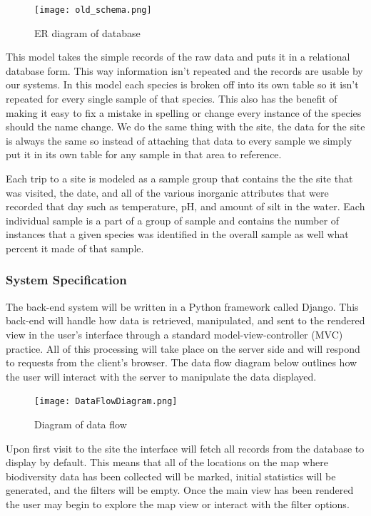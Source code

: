 \begin{figure}[h]
	\centering
	\texttt{[image: old\_schema.png]}
	\captionsetup{justification=centering}
	\caption{
		ER diagram of database
	}
	\label{fig:old_schema}
\end{figure}

This model takes the simple records of the raw data and puts it in a relational database form.
This way information isn’t repeated and the records are usable by our systems.
In this model each species is broken off into its own table so it isn’t repeated for every single sample of that species.
This also has the benefit of making it easy to fix a mistake in spelling or change every instance of the species should the name change.
We do the same thing with the site, the data for the site is always the same so instead of attaching that data to every sample we simply put it in its own table for any sample in that area to reference.

Each trip to a site is modeled as a sample group that contains the the site that was visited, the date, and all of the various inorganic attributes that were recorded that day such as temperature, pH, and amount of silt in the water.
Each individual sample is a part of a group of sample and contains the number of instances that a given species was identified in the overall sample as well what percent it made of that sample.

\subsubsection{System Specification}
The back-end system will be written in a Python framework called Django. This back-end will handle how data is retrieved, manipulated, and sent to the rendered view in the user’s interface through a standard model-view-controller (MVC) practice. All of this processing will take place on the server side and will respond to requests from the client’s browser. The data flow diagram below outlines how the user will interact with the server to manipulate the data displayed.

\begin{figure}[h]
	\centering
	\texttt{[image: DataFlowDiagram.png]}
	\captionsetup{justification=centering}
	\caption{
		Diagram of data flow
	}
	\label{fig:data_flow}
\end{figure}

Upon first visit to the site the interface will fetch all records from the database to display by default. This means that all of the locations on the map where biodiversity data has been collected will be marked, initial statistics will be generated, and the filters will be empty. Once the main view has been rendered the user may begin to explore the map view or interact with the filter options.

